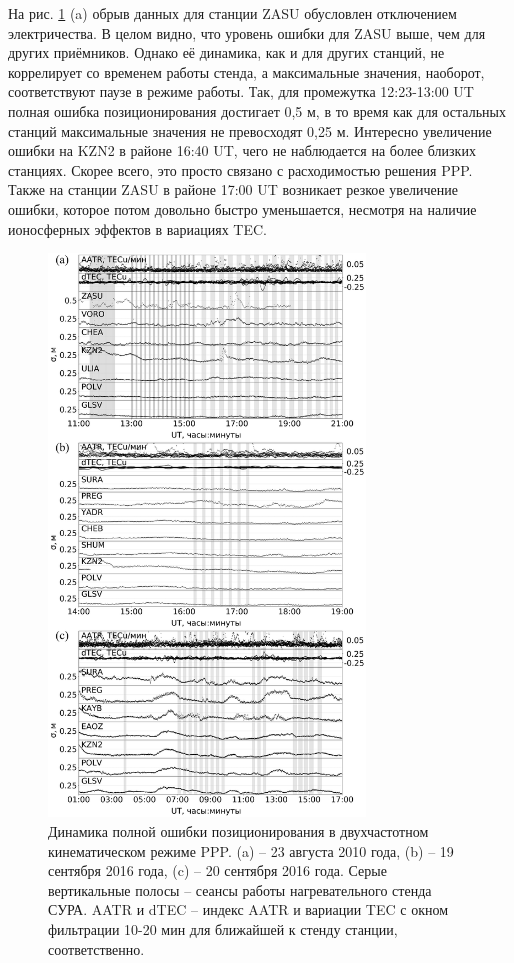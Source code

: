 На рис. \ref{fig-ppp-sura} (a) обрыв данных для станции ZASU обусловлен отключением электричества.
В целом видно, что уровень ошибки для ZASU выше, чем для других приёмников.
Однако её динамика, как и для других станций, не коррелирует со временем работы стенда, а максимальные значения, наоборот, соответствуют паузе в режиме работы.
Так, для промежутка 12:23-13:00 UT полная ошибка позиционирования достигает 0,5 м, в то время как для остальных станций максимальные значения не превосходят 0,25 м.
Интересно увеличение ошибки на KZN2 в районе 16:40 UT, чего не наблюдается на более близких станциях.
Скорее всего, это просто связано с расходимостью решения PPP.
Также на станции ZASU в районе 17:00 UT возникает резкое увеличение ошибки, которое потом довольно быстро уменьшается, несмотря на наличие ионосферных эффектов в вариациях TEC.
\begin{figure}[h]
\centering    
\includegraphics[width=0.75\textwidth]{fig/ppp-sura.png}    
\caption{Динамика полной ошибки позиционирования в двухчастотном кинематическом режиме PPP. (a) -- 23 августа 2010 года, (b) -- 19 сентября 2016 года, (c) -- 20 сентября 2016 года. Серые вертикальные полосы -- сеансы работы нагревательного стенда СУРА. AATR и dTEC -- индекс AATR и вариации TEC с окном фильтрации 10-20 мин для ближайшей к стенду станции, соответственно.}
\label{fig-ppp-sura}      
\end{figure} 
\clearpage

